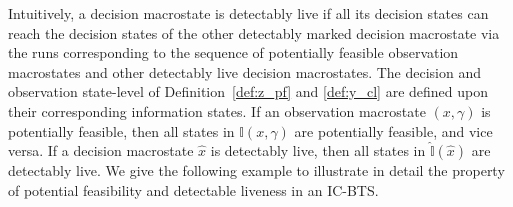 \documentclass[twocolumn]{autart}
\begin{document}
Intuitively, a decision macrostate is detectably live if all its decision states can reach the decision states of the other detectably marked decision macrostate via the runs corresponding to the sequence of potentially feasible observation macrostates and other detectably live decision macrostates.
The decision and observation state-level of Definition~\ref{def:z_pf} and \ref{def:y_cl} are defined upon their corresponding information states.
If an observation macrostate $(x, \gamma)$ is potentially feasible, then all states in 
$\mathbb{I}(x, \gamma)$ are potentially feasible, and vice versa.
If a decision macrostate $\hat{x}$ is detectably live, then all states in 
$\hat{\mathbb{I}}(\hat{x})$ are detectably live.
We give the following example to illustrate in detail the property of potential feasibility and detectable liveness in an IC-BTS.
\end{document}
